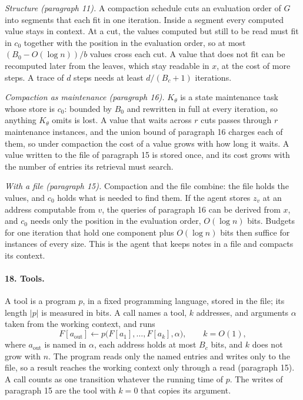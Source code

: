 \documentclass[11pt]{article}
\begin{document}
\emph{Structure (paragraph 11).} A compaction schedule cuts an
evaluation order of $G$ into segments that each fit in one iteration.
Inside a segment every computed value stays in context. At a cut, the
values computed but still to be read must fit in $c_0$ together with the
position in the evaluation order, so at most $(B_0-O(\log n))/b$ values
cross each cut. A value that does not fit can be recomputed later from
the leaves, which stay readable in $x$, at the cost of more steps. A
trace of $d$ steps needs at least $d/(B_c+1)$ iterations.

\emph{Compaction as maintenance (paragraph 16).} $K_\theta$ is a state
maintenance task whose store is $c_0$: bounded by $B_0$ and rewritten in
full at every iteration, so anything $K_\theta$ omits is lost. A value
that waits across $r$ cuts passes through $r$ maintenance instances, and
the union bound of paragraph 16 charges each of them, so under
compaction the cost of a value grows with how long it waits. A value
written to the file of paragraph 15 is stored once, and its cost grows
with the number of entries its retrieval must search.

\emph{With a file (paragraph 15).} Compaction and the file combine: the
file holds the values, and $c_0$ holds what is needed to find them. If
the agent stores $z_v$ at an address computable from $v$, the queries of
paragraph 16 can be derived from $x$, and $c_0$ needs only the position
in the evaluation order, $O(\log n)$ bits. Budgets for one iteration
that hold one component plus $O(\log n)$ bits then suffice for instances
of every size. This is the agent that keeps notes in a file and compacts
its context.

\paragraph{18. Tools.}
A tool is a program $p$, in a fixed programming language, stored in the
file; its length $|p|$ is measured in bits. A call names a tool, $k$
addresses, and arguments $\alpha$ taken from the working context, and
runs
\[
F[a_{\mathrm{out}}]\leftarrow p\big(F[a_1],\ldots,F[a_k],\alpha\big),
\qquad k=O(1),
\]
where $a_{\mathrm{out}}$ is named in $\alpha$, each address holds at most
$B_c$ bits, and $k$ does not grow with $n$. The program reads only the
named entries and writes only to the file, so a result reaches the
working context only through a read (paragraph 15). A call counts as one
transition whatever the running time of $p$. The writes of paragraph 15
are the tool with $k=0$ that copies its argument.
\end{document}

